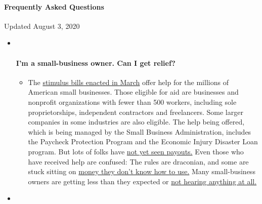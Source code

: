 \hypertarget{frequently-asked-questions}{%
\paragraph{Frequently Asked
Questions}\label{frequently-asked-questions}}

Updated August 3, 2020

\begin{itemize}
\item ~
  \hypertarget{im-a-small-business-owner-can-i-get-relief}{%
  \paragraph{I'm a small-business owner. Can I get
  relief?}\label{im-a-small-business-owner-can-i-get-relief}}

  \begin{itemize}
  \tightlist
  \item
    The
    \href{https://www.nytimes3xbfgragh.onion/article/small-business-loans-stimulus-grants-freelancers-coronavirus.html?action=click\&pgtype=Article\&state=default\&region=MAIN_CONTENT_3\&context=storylines_faq}{stimulus
    bills enacted in March} offer help for the millions of American
    small businesses. Those eligible for aid are businesses and
    nonprofit organizations with fewer than 500 workers, including sole
    proprietorships, independent contractors and freelancers. Some
    larger companies in some industries are also eligible. The help
    being offered, which is being managed by the Small Business
    Administration, includes the Paycheck Protection Program and the
    Economic Injury Disaster Loan program. But lots of folks have
    \href{https://www.nytimes3xbfgragh.onion/interactive/2020/05/07/business/small-business-loans-coronavirus.html?action=click\&pgtype=Article\&state=default\&region=MAIN_CONTENT_3\&context=storylines_faq}{not
    yet seen payouts.} Even those who have received help are confused:
    The rules are draconian, and some are stuck sitting on
    \href{https://www.nytimes3xbfgragh.onion/2020/05/02/business/economy/loans-coronavirus-small-business.html?action=click\&pgtype=Article\&state=default\&region=MAIN_CONTENT_3\&context=storylines_faq}{money
    they don't know how to use.} Many small-business owners are getting
    less than they expected or
    \href{https://www.nytimes3xbfgragh.onion/2020/06/10/business/Small-business-loans-ppp.html?action=click\&pgtype=Article\&state=default\&region=MAIN_CONTENT_3\&context=storylines_faq}{not
    hearing anything at all.}
  \end{itemize}
\item ~
  \hypertarget{what-are-my-rights-if-i-am-worried-about-going-back-to-work}{%
}
\end{itemize}
